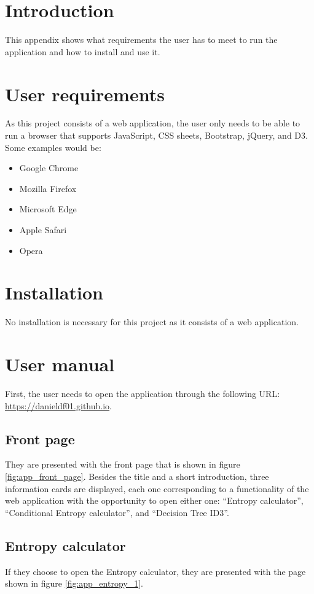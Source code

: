 
\section{Introduction}
This appendix shows what requirements the user has to meet to run the application and how to install and use it.

\section{User requirements}
As this project consists of a web application, the user only needs to be able to run a browser that supports JavaScript, CSS sheets, Bootstrap, jQuery, and D3. Some examples would be:
\begin{itemize}
    \item Google Chrome
    \item Mozilla Firefox
    \item Microsoft Edge
    \item Apple Safari
    \item Opera
\end{itemize}

\section{Installation}
No installation is necessary for this project as it consists of a web application.

\section{User manual}
First, the user needs to open the application through the following URL: \url{https://danieldf01.github.io}.

\subsection{Front page}
They are presented with the front page that is shown in figure \ref{fig:app_front_page}.
Besides the title and a short introduction, three information cards are displayed, each one corresponding to a functionality of the web application with the opportunity to open either one: ``Entropy calculator'', ``Conditional Entropy calculator'', and ``Decision Tree ID3''. 

\subsection{Entropy calculator}
If they choose to open the Entropy calculator, they are presented with the page shown in figure \ref{fig:app_entropy_1}.

